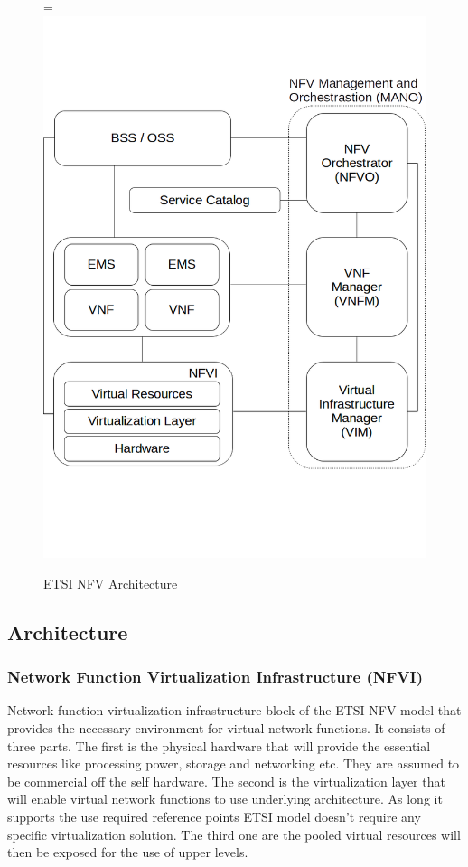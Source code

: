 \documentclass[12pt,oneandhalf,chaparabic,ceng,ms,eng,oneside,pntc]{gsufbe}
\makeatletter
\let\old@includegraphics\includegraphics
\renewcommand{\includegraphics}[2][,]{%
  \setbox9=\hbox{\old@includegraphics[#1]{#2}}%
  \ifdim\wd9>\textwidth
    \old@includegraphics[#1,width=\textwidth]{#2}%
  \else
    \old@includegraphics[#1]{#2}%
  \fi%
}
\makeatother
\begin{document}
\begin{figure}
\centering
\includegraphics[]{mano.png}
\caption{ETSI NFV Architecture}
\label{fig:mano}
\end{figure}

\subsection{Architecture}
\subsubsection{Network Function Virtualization Infrastructure (NFVI)}
Network function virtualization infrastructure block of the ETSI NFV model that provides the necessary
environment for virtual network functions. It consists of three parts. The first is the physical hardware
that will provide the essential resources like processing power, storage and networking etc. They are
assumed to be commercial off the self hardware. The second is the virtualization layer that will enable
virtual network functions to use underlying architecture. As long it supports the use required reference
points ETSI model doesn't require any specific virtualization solution. The third one
are the pooled virtual resources will then be exposed for the use of upper levels.
\end{document}
